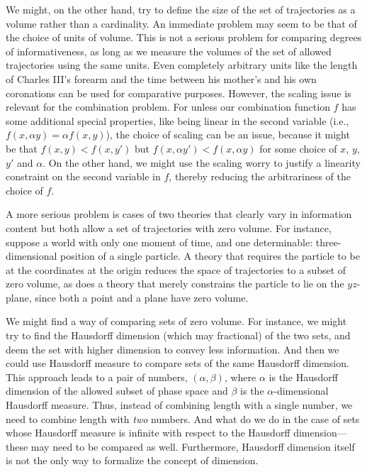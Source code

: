 We might, on the other hand, try to define the size of the set of trajectories as a volume rather than a cardinality. 
An immediate problem may seem to be that of the choice of units of volume. This is not a serious problem for comparing
degrees of informativeness,  as long as we measure the volumes of the set of allowed trajectories using the 
same units. Even completely arbitrary units like the length of Charles III's forearm and the time between his mother's
and his own coronations can be used for comparative purposes. However, the scaling issue is relevant for the combination
problem. For unless our combination function $f$ has some additional special properties, like being linear in the second variable
(i.e., $f(x,\alpha y)=\alpha f(x,y)$), the choice of scaling can be an issue, because it might be that $f(x,y)<f(x,y')$ but 
$f(x,\alpha y')<f(x,\alpha y)$ for some choice of $x$, $y$, $y'$ and $\alpha$. On the other hand, we might use the scaling worry
to justify a linearity constraint on the second variable in $f$, thereby reducing the arbitrariness of the choice of $f$.

A more serious problem is 
cases of two theories that clearly vary in information content but both allow a set of trajectories with zero volume. For instance, 
suppose a world with only one moment of time, and one determinable: three-dimensional position of a single
particle. A theory that requires the particle to be at the coordinates at the origin reduces the space of trajectories to a subset of zero
volume, as does a theory that merely constrains the particle to lie on the $yz$-plane, since both a point and a plane  have zero volume. 

We might find a way of comparing sets of zero volume. For instance, we might try to find the Hausdorff dimension (which may fractional)
of the two sets, and deem the set with higher dimension to convey less information. And then we could use Hausdorff measure to compare
sets of the same Hausdorff dimension. This approach leads to a pair of numbers, $(\alpha,\beta)$, where $\alpha$ is the Hausdorff dimension of the allowed subset of phase space
and $\beta$ is the $\alpha$-dimensional Hausdorff measure. Thus, instead of combining length with a single number, we need to combine length
with \textit{two} numbers. And what do we do in the case of sets whose Hausdorff measure is infinite with respect to the Hausdorff dimension---these
may need to be compared as well. Furthermore, Hausdorff dimension itself
is not the only way to formalize the concept of dimension.

